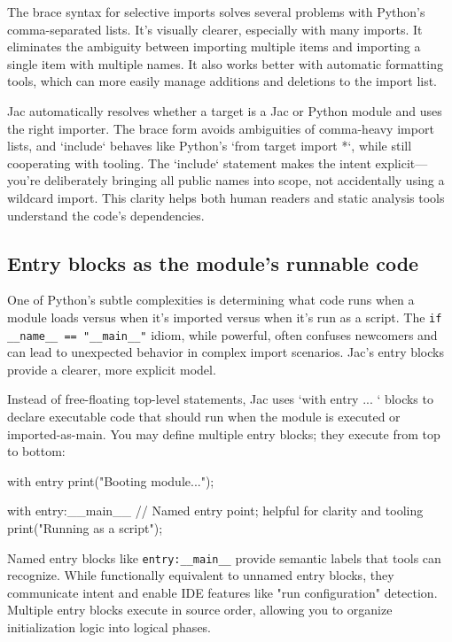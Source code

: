 The brace syntax for selective imports solves several problems with Python's comma-separated lists. It's visually clearer, especially with many imports. It eliminates the ambiguity between importing multiple items and importing a single item with multiple names. It also works better with automatic formatting tools, which can more easily manage additions and deletions to the import list.

Jac automatically resolves whether a target is a Jac or Python module and uses the right importer. The brace form avoids ambiguities of comma-heavy import lists, and `include` behaves like Python's `from target import *`, while still cooperating with tooling. The `include` statement makes the intent explicit—you're deliberately bringing all public names into scope, not accidentally using a wildcard import. This clarity helps both human readers and static analysis tools understand the code's dependencies.

\subsection{Entry blocks as the module's runnable code}

One of Python's subtle complexities is determining what code runs when a module loads versus when it's imported versus when it's run as a script. The \verb|if __name__ == "__main__"| idiom, while powerful, often confuses newcomers and can lead to unexpected behavior in complex import scenarios. Jac's entry blocks provide a clearer, more explicit model.

Instead of free-floating top-level statements, Jac uses `with entry { ... }` blocks to declare executable code that should run when the module is executed or imported-as-main. You may define multiple entry blocks; they execute from top to bottom:

\begin{jacblock}
with entry {
    print("Booting module...");
}

with entry:__main__ {
    // Named entry point; helpful for clarity and tooling
    print("Running as a script");
}
\end{jacblock}

Named entry blocks like \texttt{entry:\_\_main\_\_} provide semantic labels that tools can recognize. While functionally equivalent to unnamed entry blocks, they communicate intent and enable IDE features like "run configuration" detection. Multiple entry blocks execute in source order, allowing you to organize initialization logic into logical phases.

